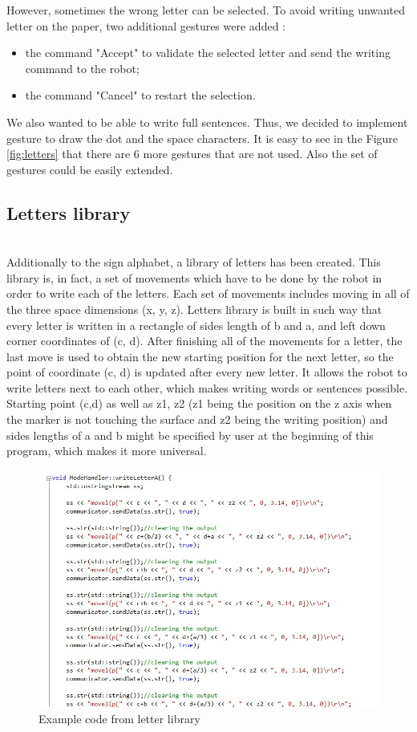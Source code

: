 However, sometimes the wrong letter can be selected. To avoid writing unwanted letter on the paper, two additional gestures were added :
\begin{itemize}
	\item the command "Accept" to validate the selected letter and send the writing command to the robot;
	\item the command "Cancel" to restart the selection.
\end{itemize}

We also wanted to be able to write full sentences. Thus, we decided to implement gesture to draw the dot and the space characters. It is easy to see in the Figure \ref{fig:letters} that there are 6 more gestures that are not used. Also the set of gestures could be easily extended.

\subsection{Letters library}

\mbox{}\\
Additionally to the sign alphabet, a library of letters has been created. This library is, in fact, a set of movements which have to be done by the robot in order to write each of the letters. Each set of movements includes moving in all of the three space dimensions (x, y, z). Letters library is built in such way that every letter is written in a rectangle of sides length of b and a, and left down corner coordinates of (c, d). After finishing all of the movements for a letter, the last move is used to obtain the new starting position for the next letter, so the point of coordinate (c, d) is updated after every new letter. It allows the robot to write letters next to each other, which makes writing words or sentences possible. Starting point (c,d) as well as z1, z2 (z1 being the position on the z axis when the marker is not touching the surface and z2 being the writing position) and sides lengths of a and b might be specified by user at the beginning of this program, which makes it more universal.\\

\begin{figure}[H]
	\includegraphics[scale=0.8]{Aletter}
	\centering
	\caption{Example code from letter library}
	\label{fig:Aletter}
\end{figure}

